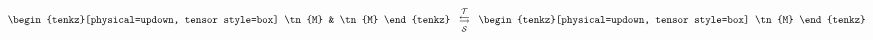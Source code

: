 \documentclass[varwidth=19cm, border=6pt]{standalone}
\begin{document}
\[
  \begin{tenkz}[physical=updown, tensor style=box]
    \tn{M} & \tn{M}
  \end{tenkz}
  \;\;\overset{\mathcal{T}}{\underset{\mathcal{S}}{\leftrightarrows}}\;\;
  \begin{tenkz}[physical=updown, tensor style=box]
    \tn{M}
  \end{tenkz}
\]
\end{document}
